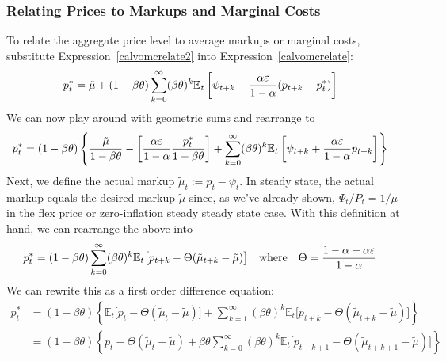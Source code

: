\documentclass[12pt]{article}
\theoremstyle{plain}
\theoremstyle{definition}
\theoremstyle{remark}
\newcommand{\E}{\mathbb{E}}
\begin{document}
\subsubsection{Relating Prices to Markups and Marginal Costs}

To relate the aggregate price level to average markups or marginal
costs, substitute Expression~\ref{calvomcrelate2} into
Expression~\ref{calvomcrelate}:
\begin{align}
  p_t^*
  &=
  \tilde{\mu} +
  (1-\beta\theta)\sum_{k=0}^\infty
  (\beta\theta)^k
  \E_t\left[
    \psi_{t+k} +
    \frac{\alpha\varepsilon }{1-\alpha}
    (p_{t+k}-p_t^*)
  \right]
  \notag
\end{align}
We can now play around with geometric sums and rearrange to
\begin{align}
  p_t^*
  &=
  (1-\beta\theta)
  \left\{
  \frac{\tilde{\mu}}{1-\beta\theta}
  -
  \left[
  \frac{\alpha\varepsilon }{1-\alpha}
  \frac{p_t^*}{1-\beta\theta}
  \right]
  +
  \sum_{k=0}^\infty
  (\beta\theta)^k
  \E_t\left[
    \psi_{t+k} +
    \frac{\alpha\varepsilon }{1-\alpha}
    p_{t+k}
  \right]
  \right\}
  \notag
\end{align}
Next, we define the actual markup $\tilde{\mu}_t := p_t-\psi_t$.
In steady state, the actual markup equals the desired markup
$\tilde{\mu}$ since, as we've already shown, $\Psi_t/P_t = 1/\mu$ in
the flex price or zero-inflation steady steady state case. With this
definition at hand, we can rearrange the above into
\begin{align}
  p_t^*
  &=
  (1-\beta\theta)
  \sum_{k=0}^\infty
  (\beta\theta)^k
  \E_t\big[
    p_{t+k}
    -
    \Theta
    (
    \tilde{\mu}_{t+k}
    -\tilde{\mu}
    )
  \big]
  \quad\text{where}\quad
  \Theta
  =
  \frac{1-\alpha +\alpha\varepsilon}{1-\alpha}
  \notag
\end{align}
We can rewrite this as a first order difference equation:
\begin{align*}
  p_t^*
  &=
  (1-\beta\theta)
  \left\{
  \E_t\big[
    p_{t}
    -
    \Theta
    (
    \tilde{\mu}_{t}
    -\tilde{\mu}
    )
  \big]
  +
  \sum_{k=1}^\infty
  (\beta\theta)^k
  \E_t\big[
    p_{t+k}
    -
    \Theta
    (
    \tilde{\mu}_{t+k}
    -\tilde{\mu}
    )
  \big]
  \right\}
  \\
  &=
  (1-\beta\theta)
  \left\{
  p_{t}
  -
  \Theta
  (
  \tilde{\mu}_{t}
  -\tilde{\mu}
  )
  +
  \beta\theta
  \sum_{k=0}^\infty
  (\beta\theta)^k
  \E_t\big[
    p_{t+k+1}
    -
    \Theta
    (
    \tilde{\mu}_{t+k+1}
    -\tilde{\mu}
    )
  \big]
  \right\}
\end{align*}
\end{document}
